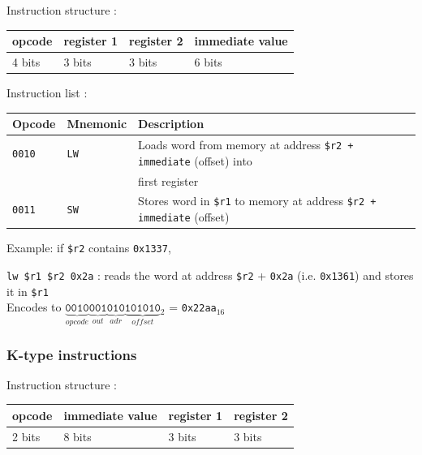 \documentclass[a4paper]{report}
\begin{document}
Instruction structure :

\begin{center}
	\begin{tabular}{|l|l|l|l|}
		\hline
		opcode & register 1 & register 2 & immediate value \\
		\hline
		4 bits & 3 bits & 3 bits & 6 bits \\
		\hline
	\end{tabular}
\end{center}

Instruction list :

\begin{center}
	\begin{tabular}{|l|l|l|}
		\hline
		Opcode & Mnemonic & Description \\
		\hline \hline
		\texttt{0010} & \texttt{LW} & Loads word from memory at address
		                              \texttt{\$r2 + immediate} (offset) into \\
		              &             & first register \\
		\texttt{0011} & \texttt{SW} & Stores word in \texttt{\$r1} to memory at
		                           address \texttt{\$r2 + immediate} (offset) \\
		\hline
	\end{tabular}
\end{center}

Example: if \texttt{\$r2} contains \texttt{0x1337},

\texttt{lw \$r1 \$r2 0x2a} : reads the word at address \texttt{\$r2} +
\texttt{0x2a} (i.e. \texttt{0x1361}) and stores it in \texttt{\$r1} \\
Encodes to ${
	\underbrace{\texttt{0010}}_{opcode}
	\underbrace{\texttt{001}}_{out}
	\underbrace{\texttt{010}}_{adr}
	\underbrace{\texttt{101010}}_{offset}\mbox{}_2
}$ = \texttt{0x22aa}$_{16}$

\subsubsection{K-type instructions}

Instruction structure :

\begin{center}
	\begin{tabular}{|l|l|l|l|}
		\hline
		opcode & immediate value & register 1 & register 2 \\
		\hline
		2 bits & 8 bits & 3 bits & 3 bits \\
		\hline
	\end{tabular}
\end{center}
\end{document}
